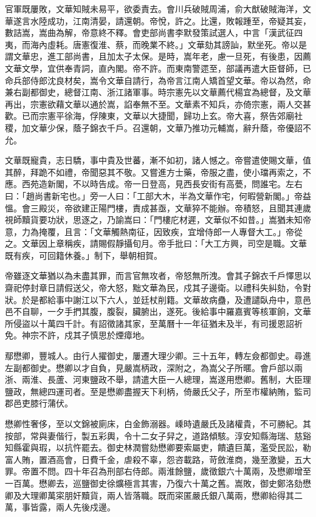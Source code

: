 \begin{pinyinscope}
官軍既屢敗，文華知賊未易平，欲委責去。會川兵破賊周浦，俞大猷破賊海洋，文華遂言水陸成功，江南清晏，請還朝。帝悅，許之。比還，敗報踵至，帝疑其妄，數詰嵩，嵩曲為解，帝意終不釋。會吏部尚書李默發策試選人，中言「漢武征四夷，而海內虛耗。唐憲復淮、蔡，而晚業不終。」文華劾其謗訕，默坐死。帝以是謂文華忠，進工部尚書，且加太子太保。是時，嵩年老，慮一旦死，有後患，因薦文華文學，宜供奉青詞，直內閣。帝不許。而東南警遝至，部議再遣大臣督師，已命兵部侍郎沈良材矣，嵩令文華自請行，為帝言江南人矯首望文華。帝以為然，命兼右副都御史，總督江南、浙江諸軍事。時宗憲先以文華薦代楊宜為總督，及文華再出，宗憲欲藉文華以通於嵩，諂奉無不至。文華素不知兵，亦倚宗憲，兩人交甚歡。已而宗憲平徐海，俘陳東，文華以大捷聞，歸功上玄。帝大喜，祭告郊廟社稷，加文華少保，蔭子錦衣千戶。召還朝，文華乃推功元輔嵩，辭升蔭，帝優詔不允。

文華既寵貴，志日驕，事中貴及世蕃，漸不如初，諸人憾之。帝嘗遣使賜文華，值其醉，拜跪不如禮，帝聞惡其不敬。又嘗進方士藥，帝服之盡，使小璫再索之，不應。西苑造新閣，不以時告成。帝一日登高，見西長安街有高甍，問誰宅。左右曰：「趙尚書新宅也。」旁一人曰：「工部大木，半為文華作宅，何暇營新閣。」帝益慍。會三殿災，帝欲建正陽門樓，責成甚亟，文華猝不能辦。帝積怒，且聞其連歲視師黷貨要功狀，思逐之，乃諭嵩曰：「門樓庀材遲，文華似不如昔。」嵩猶未知帝意，力為掩覆，且言：「文華觸熱南征，因致疾，宜增侍郎一人專督大工。」帝從之。文華因上章稱疾，請賜假靜攝旬月。帝手批曰：「大工方興，司空是職。文華既有疾，可回籍休養。」制下，舉朝相賀。

帝雖逐文華猶以為未盡其罪，而言官無攻者，帝怒無所洩。會其子錦衣千戶懌思以齋祀停封章日請假送父，帝大怒，黜文華為民，戍其子邊衛。以禮科失糾劾，令對狀。於是都給事中謝江以下六人，並廷杖削籍。文華故病蠱，及遭譴臥舟中，意邑邑不自聊，一夕手捫其腹，腹裂，臟腑出，遂死。後給事中羅嘉賓等核軍餉，文華所侵盜以十萬四千計。有詔徵諸其家，至萬曆十一年征猶未及半，有司援恩詔祈免。神宗不許，戍其子慎思於煙瘴地。

鄢懋卿，豐城人。由行人擢御史，屢遷大理少卿。三十五年，轉左僉都御史。尋進左副都御史。懋卿以才自負，見嚴嵩柄政，深附之，為嵩父子所暱。會戶部以兩浙、兩淮、長蘆、河東鹽政不舉，請遣大臣一人總理，嵩遂用懋卿。舊制，大臣理鹽政，無總四運司者。至是懋卿盡握天下利柄，倚嚴氏父子，所至市權納賄，監司郡邑吏膝行蒲伏。

懋卿性奢侈，至以文錦被廁床，白金飾溺器。嵊時遺嚴氏及諸權貴，不可勝紀。其按部，常與妻偕行，製五彩輿，令十二女子舁之，道路傾駭。淳安知縣海瑞、慈谿知縣霍與瑕，以抗忤罷去。御史林潤嘗劾懋卿要索屬吏，饋遺巨萬，濫受民訟，勒富人賄，置酒高會，日費千金，虐殺不辜，怨咨載路，苛斂淮商，幾至激變，五大罪。帝置不問。四十年召為刑部右侍郎。兩淮餘鹽，歲徵銀六十萬兩，及懋卿增至一百萬。懋卿去，巡鹽御史徐爌極言其害，乃復六十萬之舊。嵩敗，御史鄭洛劾懋卿及大理卿萬寀朋奸黷貨，兩人皆落職。既而寀匿嚴氏銀八萬兩，懋卿紿得其二萬，事皆露，兩人先後戍邊。


\end{pinyinscope}
